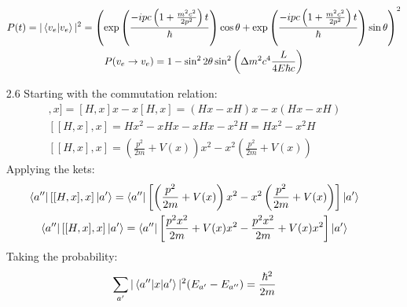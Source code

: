 \documentclass[12pt]{article}
\begin{document}
\begin{enumerate}
\begin{gather*}
      P(t)=|\braket{v_e|v_e}|^2=\left( \exp\left( \frac{-ipc\left( 1+\frac{m^2 c^2}{2p^2} \right) t}{\hbar} \right)\cos\theta+\exp\left( \frac{-ipc\left( 1+\frac{m^2 c^2}{2p^2} \right) t}{\hbar} \right)\sin\theta\right)^2\\
      P(v_e\rightarrow v_e)=1-\sin^2 2\theta\sin^2\left( \Delta m^2 c^4\frac{L}{4E\hbar c} \right)
    \end{gather*}
    \item[2.6] Starting with the commutation relation:
    \begin{gather*}
      [[H,x],x]=[H,x]x-x[H,x]=(Hx-xH)x-x(Hx-xH)\\
      [[H,x],x]=Hx^2-xHx-xHx-x^2 H=Hx^2-x^2 H\\
      [[H,x],x]=\left(\frac{p^2}{2m}+V(x)\right)x^2-x^2 \left(\frac{p^2}{2m}+V(x)\right)
    \end{gather*}
    Applying the kets:
    \begin{gather*}
      \bra{a''}[[H,x],x]\ket{a'}=\bra{a''}\left[\left(\frac{p^2}{2m}+V(x)\right)x^2-x^2 \left(\frac{p^2}{2m}+V(x)\right)\right]\ket{a'}\\
      \bra{a''}[[H,x],x]\ket{a'}=\bra{a''}\left[\frac{p^2 x^2}{2m}+V(x)x^2-\frac{p^2 x^2}{2m}+V(x)x^2\right]\ket{a'}
    \end{gather*}
    Taking the probability:
    \begin{gather*}
      \sum_{a'}|\braket{a''|x|a'}|^2(E_{a'}-E_{a''})=\frac{\hbar^2}{2m}
    \end{gather*}
  \end{enumerate}
\end{document}
